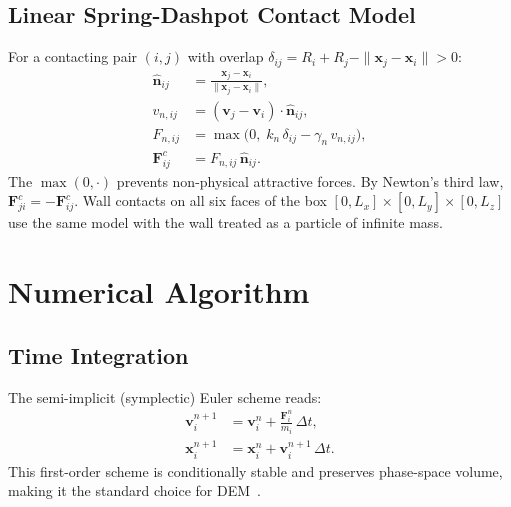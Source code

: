 \documentclass[journal]{IEEEtran}
\begin{document}
\subsection{Linear Spring-Dashpot Contact Model}
For a contacting pair $(i,j)$ with overlap
$\delta_{ij} = R_i + R_j - \|\mathbf{x}_j - \mathbf{x}_i\| > 0$:
\begin{align}
  \hat{\mathbf{n}}_{ij} &= \frac{\mathbf{x}_j - \mathbf{x}_i}
                              {\|\mathbf{x}_j - \mathbf{x}_i\|}, \\
  v_{n,ij} &= (\mathbf{v}_j - \mathbf{v}_i)\cdot\hat{\mathbf{n}}_{ij}, \\
  F_{n,ij} &= \max\!\bigl(0,\; k_n\,\delta_{ij} - \gamma_n\,v_{n,ij}\bigr),
  \label{eq:fn} \\
  \mathbf{F}^{c}_{ij} &= F_{n,ij}\,\hat{\mathbf{n}}_{ij}.
\end{align}
The $\max(0,\cdot)$ prevents non-physical attractive forces.
By Newton's third law, $\mathbf{F}^{c}_{ji} = -\mathbf{F}^{c}_{ij}$.
Wall contacts on all six faces of the box
$[0,L_x]\times[0,L_y]\times[0,L_z]$ use the same model with the wall
treated as a particle of infinite mass.

\section{Numerical Algorithm}

\subsection{Time Integration}
The semi-implicit (symplectic) Euler scheme reads:
\begin{align}
  \mathbf{v}_i^{n+1} &= \mathbf{v}_i^{n}
    + \frac{\mathbf{F}_i^{n}}{m_i}\,\Delta t, \label{eq:vel} \\
  \mathbf{x}_i^{n+1} &= \mathbf{x}_i^{n}
    + \mathbf{v}_i^{n+1}\,\Delta t. \label{eq:pos}
\end{align}
This first-order scheme is conditionally stable and preserves
phase-space volume, making it the standard choice for DEM~\cite{allen2017}.
\end{document}

